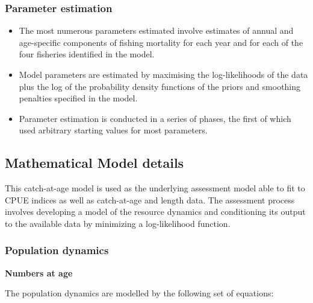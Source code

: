 \documentclass{article}
\begin{document}

\subsubsection{Parameter estimation}


\begin{itemize}

\item The most numerous parameters estimated involve estimates of annual and age-specific components of fishing mortality for each year and for each of the four fisheries identified in the model.

\item Model parameters are estimated by maximising the log-likelihoods of the data plus the log of the probability density functions of the priors and smoothing penalties specified in the model.

\item Parameter estimation is conducted in a series of phases, the first of which used arbitrary starting values for most parameters.

\end{itemize}


\subsection{Mathematical Model details}

This catch-at-age model is used as the underlying assessment model able to fit to CPUE indices as well as catch-at-age and length data. The assessment process involves developing a model of the resource dynamics and conditioning its output to the available data by minimizing a log-likelihood function.

\subsubsection{Population dynamics}

\textbf{Numbers at age}

The population dynamics are modelled by the following set of equations:
\end{document}
